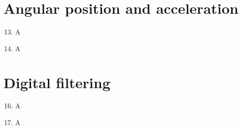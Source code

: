 \documentclass[a4paper,12pt]{article}
\begin{document}
\newpage
\section{Angular position and acceleration}

\begin{enumerate}[label={\color{blue}\arabic*)}]
    \setcounter{enumi}{12}

    \item
    A

    \item
    A

\end{enumerate}

\newpage
\section{Digital filtering}

\begin{enumerate}[label={\color{blue}\arabic*)}]
    \setcounter{enumi}{15}

    \item
    A

    \item
    A

\end{enumerate}
\end{document}
